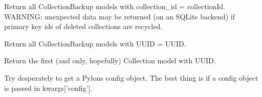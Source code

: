 \documentclass[letterpaper,10pt,english]{sphinxmanual}
\begin{document}

\begin{fulllineitems}
\label{api:old.lib.utils.getCollectionBackupsByCollectionId}
Return all CollectionBackup models with collection\_id = collectionId.
WARNING: unexpected data may be returned (on an SQLite backend) if primary
key ids of deleted collections are recycled.

\end{fulllineitems}


\begin{fulllineitems}
\label{api:old.lib.utils.getCollectionBackupsByUUID}
Return all CollectionBackup models with UUID = UUID.

\end{fulllineitems}


\begin{fulllineitems}
\label{api:old.lib.utils.getCollectionByUUID}
Return the first (and only, hopefully) Collection model with UUID.

\end{fulllineitems}


\begin{fulllineitems}
\label{api:old.lib.utils.getConfig}
Try desperately to get a Pylons config object.  The best thing is if a
config object is passed in kwargs{[}'config'{]}.

\end{fulllineitems}

\end{document}
